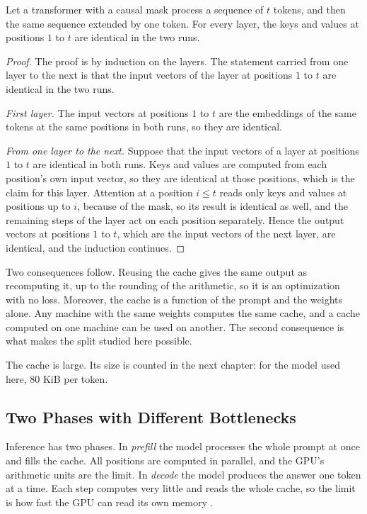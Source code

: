 \begin{proposition}
\label{prop:cache}%
Let a transformer with a causal mask process a sequence of $t$ tokens, and
then the same sequence extended by one token. For every layer, the keys and
values at positions $1$ to $t$ are identical in the two runs.
\end{proposition}

\begin{proof}
The proof is by induction on the layers. The statement carried from one
layer to the next is that the input vectors of the layer at positions $1$ to
$t$ are identical in the two runs.

\emph{First layer.} The input vectors at positions $1$ to $t$ are the
embeddings of the same tokens at the same positions in both runs, so they are
identical.

\emph{From one layer to the next.} Suppose that the input vectors of a layer
at positions $1$ to $t$ are identical in both runs. Keys and values are
computed from each position's own input vector, so they are identical at
those positions, which is the claim for this layer. Attention at a position
$i \le t$ reads only keys and values at positions up to $i$, because of the
mask, so its result is identical as well, and the remaining steps of the
layer act on each position separately. Hence the output vectors at positions
$1$ to $t$, which are the input vectors of the next layer, are identical, and
the induction continues.
\end{proof}

Two consequences follow. Reusing the cache gives the same output as
recomputing it, up to the rounding of the arithmetic, so it is an
optimization with no loss. Moreover, the cache is a function of the prompt and the
weights alone. Any machine with the same weights computes the same cache,
and a cache computed on one machine can be used on another. The second consequence is what makes the split studied here possible.

The cache is large. Its size is counted in the next chapter: for the model used here, 80 KiB per token.

\subsection{Two Phases with Different Bottlenecks}

Inference has two phases. In \emph{prefill} the model processes the whole
prompt at once and fills the cache. All positions are computed in parallel,
and the GPU's arithmetic units are the limit. In \emph{decode} the model
produces the answer one token at a time. Each step computes very little and
reads the whole cache, so the limit is how fast the GPU can read its own
memory \citep{pope2023}.

